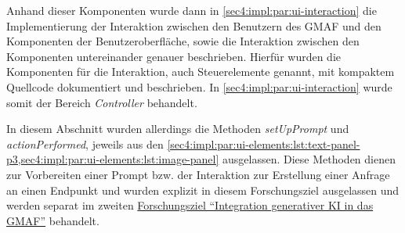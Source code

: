 Anhand dieser Komponenten wurde dann in \cref{sec4:impl:par:ui-interaction} die Implementierung der Interaktion zwischen den Benutzern des GMAF und den Komponenten der Benutzeroberfläche, sowie die Interaktion zwischen den Komponenten untereinander genauer beschrieben.
Hierfür wurden die Komponenten für die Interaktion, auch Steuerelemente genannt, mit kompaktem Quellcode dokumentiert und beschrieben.
In \cref{sec4:impl:par:ui-interaction} wurde somit der Bereich \textit{Controller} behandelt.

In diesem Abschnitt wurden allerdings die Methoden \textit{setUpPrompt} und \textit{actionPerformed}, jeweils aus den \cref{sec4:impl:par:ui-elements:lst:text-panel-p3,sec4:impl:par:ui-elements:lst:image-panel} ausgelassen.
Diese Methoden dienen zur Vorbereiten einer Prompt bzw. der Interaktion zur Erstellung einer Anfrage an einen Endpunkt und wurden explizit in diesem Forschungsziel ausgelassen und werden separat im zweiten \hyperref[sec4:impl:subsec:fz-integration]{Forschungsziel \enquote{Integration generativer KI in das GMAF}} behandelt.

